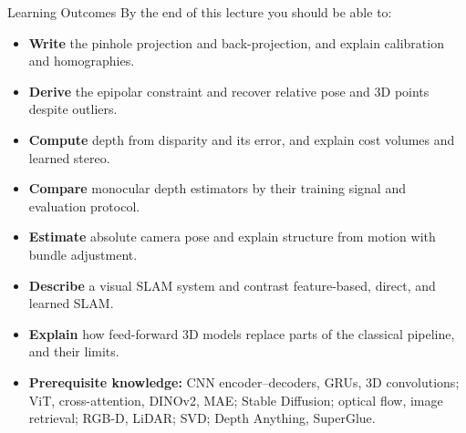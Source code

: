 \begin{frame}{Learning Outcomes}
  By the end of this lecture you should be able to:
  \begin{itemize}\small\itemsep0.2em
    \item \textbf{Write} the pinhole projection and back-projection, and explain calibration and homographies.
    \item \textbf{Derive} the epipolar constraint and recover relative pose and 3D points despite outliers.
    \item \textbf{Compute} depth from disparity and its error, and explain cost volumes and learned stereo.
    \item \textbf{Compare} monocular depth estimators by their training signal and evaluation protocol.
    \item \textbf{Estimate} absolute camera pose and explain structure from motion with bundle adjustment.
    \item \textbf{Describe} a visual SLAM system and contrast feature-based, direct, and learned SLAM.
    \item \textbf{Explain} how feed-forward 3D models replace parts of the classical pipeline, and their limits.
  \end{itemize}
  \vspace{0.2em}
  \begin{itemize}\footnotesize
    \item \textbf{Prerequisite knowledge:} CNN encoder--decoders, GRUs, 3D convolutions; ViT, cross-attention, DINOv2, MAE; Stable Diffusion; optical flow, image retrieval; RGB-D, LiDAR; SVD; Depth Anything, SuperGlue.
  \end{itemize}
\end{frame}

